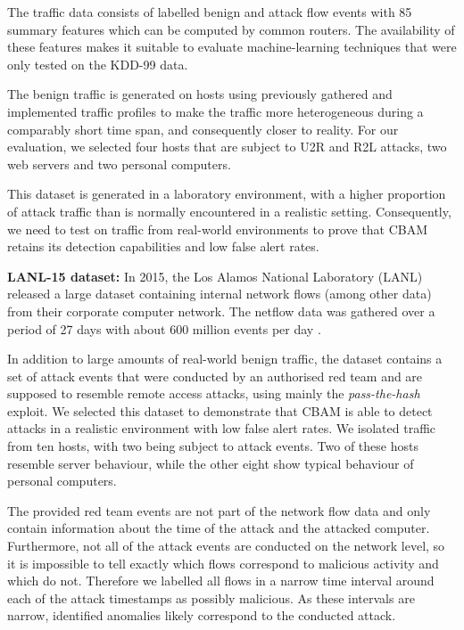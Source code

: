 The traffic data consists of labelled benign and attack flow events with 85 summary features which can be computed by common routers. The availability of these features makes it suitable to evaluate machine-learning techniques that were only tested on the KDD-99 data.

The benign traffic is generated on hosts using previously gathered and implemented traffic profiles to make the traffic more heterogeneous during a comparably short time span, and consequently closer to reality. For our evaluation, we selected four hosts that are subject to U2R and R2L attacks, two web servers and two personal computers. 

This dataset is generated in a laboratory environment, with a higher proportion of attack traffic than is normally encountered in a realistic setting. Consequently, we need to test on traffic from real-world environments to prove that CBAM retains its detection capabilities and low false alert rates. 

\textbf{LANL-15 dataset:}
In 2015, the Los Alamos National Laboratory (LANL)  released a large dataset containing internal network flows (among other data) from their corporate computer network. The netflow data was gathered over a period of 27 days with about 600 million events per day \cite{akent-2015-enterprise-data,kent-2015-cyberdata1}.

In addition to large amounts of real-world benign traffic, the dataset contains a set of attack events that were conducted by an authorised red team and are supposed to resemble remote access attacks, using mainly the \emph{pass-the-hash} exploit. We selected this dataset to demonstrate that CBAM is able to detect attacks in a realistic environment with low false alert rates. We isolated traffic from ten hosts, with two being subject to attack events. Two of these hosts resemble server behaviour, while the other eight show typical behaviour of personal computers.

The provided red team events are not part of the network flow data and only contain information about the time of the attack and the attacked computer. Furthermore, not all of the attack events are conducted on the network level, so it is impossible to tell exactly which flows  correspond to malicious activity and which do not. Therefore we labelled all flows in a narrow time interval around each of the attack timestamps as possibly malicious. As these intervals are narrow, identified anomalies likely correspond to the conducted attack. %


